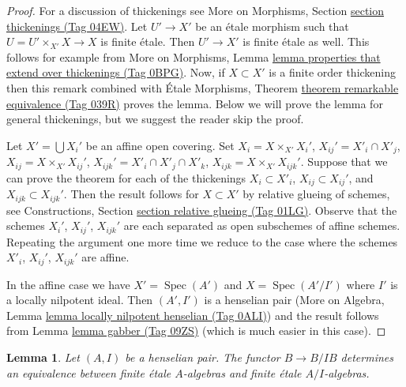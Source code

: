 \documentclass{amsart}
\theoremstyle{plain}
\newtheorem{lemma}[subsection]{Lemma}
\theoremstyle{definition}
\theoremstyle{remark}
\numberwithin{equation}{subsection}
\def\Spec{\mathop{\mathrm{Spec}}}
\begin{document}
\begin{proof}
For a discussion of thickenings see
More on Morphisms, Section \href{https://stacks.math.columbia.edu/tag/04EW}{section thickenings (Tag 04EW)}.
Let $U' \to X'$ be an \'etale morphism such that $U = U' \times_{X'} X \to X$
is finite \'etale. Then $U' \to X'$ is finite \'etale as well.
This follows for example from More on Morphisms, Lemma
\href{https://stacks.math.columbia.edu/tag/0BPG}{lemma properties that extend over thickenings (Tag 0BPG)}.
Now, if $X \subset X'$ is a finite order thickening then this remark
combined with \'Etale Morphisms, Theorem
\href{https://stacks.math.columbia.edu/tag/039R}{theorem remarkable equivalence (Tag 039R)}
proves the lemma. Below we will prove the lemma for general thickenings, but
we suggest the reader skip the proof.

\medskip\noindent
Let $X' = \bigcup X_i'$ be an affine open covering. Set
$X_i = X \times_{X'} X_i'$, $X_{ij}' = X'_i \cap X'_j$,
$X_{ij} = X \times_{X'} X_{ij}'$, $X_{ijk}' = X'_i \cap X'_j \cap X'_k$,
$X_{ijk} = X \times_{X'} X_{ijk}'$.
Suppose that we can prove
the theorem for each of the thickenings
$X_i \subset X'_i$, $X_{ij} \subset X_{ij}'$, and $X_{ijk} \subset X_{ijk}'$.
Then the result follows for $X \subset X'$ by relative glueing of
schemes, see
Constructions, Section \href{https://stacks.math.columbia.edu/tag/01LG}{section relative glueing (Tag 01LG)}.
Observe that the schemes $X_i'$, $X_{ij}'$, $X_{ijk}'$ are
each separated as open subschemes of affine schemes. Repeating the
argument one more time we reduce to the case where the schemes
$X'_i$, $X_{ij}'$, $X_{ijk}'$ are affine.

\medskip\noindent
In the affine case we have $X' = \Spec(A')$ and $X = \Spec(A'/I')$
where $I'$ is a locally nilpotent ideal. Then $(A', I')$ is a
henselian pair (More on Algebra, Lemma
\href{https://stacks.math.columbia.edu/tag/0ALI}{lemma locally nilpotent henselian (Tag 0ALI)})
and the result follows from Lemma \href{https://stacks.math.columbia.edu/tag/09ZS}{lemma gabber (Tag 09ZS)} (which is
much easier in this case).
\end{proof}


\begin{lemma}
\label{more-algebra-lemma-finite-etale-equivalence}
Let $(A, I)$ be a henselian pair. The functor $B \to B/IB$ determines
an equivalence between finite \'etale $A$-algebras and finite \'etale
$A/I$-algebras.
\end{lemma}
\end{document}
